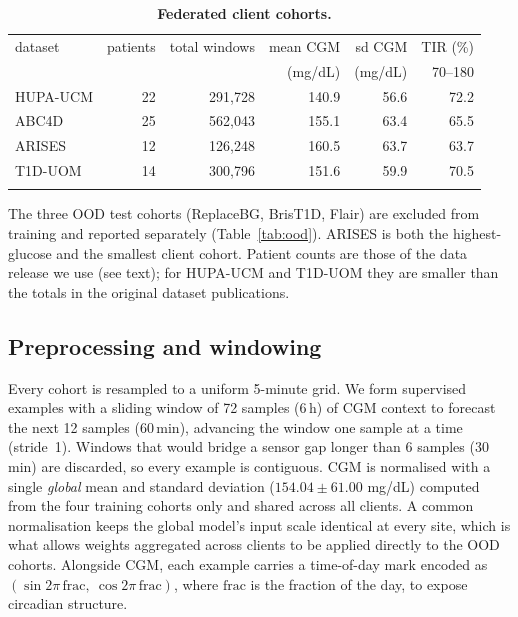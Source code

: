 \documentclass[10pt,letterpaper]{article}
\newlength\savedwidth
\newcommand\thickhline{\noalign{\global\savedwidth\arrayrulewidth\global\arrayrulewidth 2pt}%
\hline
\noalign{\global\arrayrulewidth\savedwidth}}
\begin{document}
\begin{table}[!ht]
\centering
\captionsetup{justification=centering,singlelinecheck=on}
\caption{\bf Federated client cohorts.}
\label{tab:datasets}
\begin{tabular}{lrrrrr}
\thickhline
dataset & patients & total windows & mean CGM & sd CGM & TIR (\%) \\
        &          &               & (mg/dL)  & (mg/dL) & 70--180  \\
\hline
HUPA-UCM & 22 & 291,728 & 140.9 & 56.6 & 72.2 \\
ABC4D    & 25 & 562,043 & 155.1 & 63.4 & 65.5 \\
ARISES   & 12 & 126,248 & 160.5 & 63.7 & 63.7 \\
T1D-UOM  & 14 & 300,796 & 151.6 & 59.9 & 70.5 \\
\thickhline
\end{tabular}
\begin{center}
{\small The three OOD test cohorts (ReplaceBG, BrisT1D, Flair) are excluded from
training and reported separately (Table~\ref{tab:ood}). ARISES is both the
highest-glucose and the smallest client cohort. Patient counts are those of the
data release we use (see text); for HUPA-UCM and T1D-UOM they are smaller than
the totals in the original dataset publications.}
\end{center}
\end{table}

\subsection*{Preprocessing and windowing}

Every cohort is resampled to a uniform 5-minute grid. We form supervised
examples with a sliding window of 72 samples (6\,h) of CGM context to forecast
the next 12 samples (60\,min), advancing the window one sample at a time
(stride~1). Windows that would bridge a sensor gap longer than 6 samples
(30\,min) are discarded, so every example is contiguous. CGM is normalised with
a single \emph{global} mean and standard deviation ($154.04 \pm 61.00$ mg/dL)
computed from the four training cohorts only and shared
across all clients. A common
normalisation keeps the global model's input scale identical at every site,
which is what allows weights aggregated across clients to be applied directly to
the OOD cohorts. Alongside CGM,
each example carries a time-of-day mark encoded
as $(\sin 2\pi\,\mathrm{frac},\ \cos 2\pi\,\mathrm{frac})$, where $\mathrm{frac}$
is the fraction of the day, to expose circadian structure.
\end{document}
